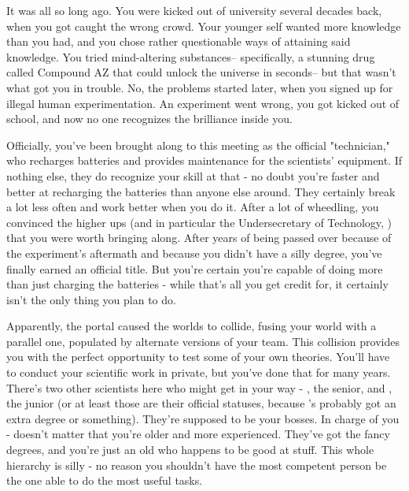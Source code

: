 \documentclass[char]{guildcamp3}
\begin{document}
\name{\cTech{}}

It was all so long ago. You were kicked out of university several decades back, when you got caught the wrong crowd. Your younger self wanted more knowledge than you had, and you chose rather questionable ways of attaining said knowledge. You tried mind-altering substances-- specifically, a stunning drug called Compound AZ that could unlock the universe in seconds-- but that wasn't what got you in trouble. No, the problems started later, when you signed up for illegal human experimentation. An experiment went wrong, you got kicked out of school, and now no one recognizes the brilliance inside you.

Officially, you've been brought along to this meeting as the official "technician," who recharges batteries and provides maintenance for the scientists' equipment. If nothing else, they do recognize your skill at that - no doubt you're faster and better at recharging the batteries than anyone else around. They certainly break a lot less often and work better when you do it. After a lot of wheedling, you convinced the higher ups (and in particular the Undersecretary of Technology, \cPoliTwo{\intro}) that you were worth bringing along. After years of being passed over because of the experiment's aftermath and because you didn't have a silly degree, you've finally earned an official title. But you're certain you're capable of doing more than just charging the batteries - while that's all you get credit for, it certainly isn't the only thing you plan to do. 

Apparently, the portal caused the worlds to collide, fusing your world with a parallel one, populated by alternate versions of your team. This collision provides you with the perfect opportunity to test some of your own theories. You'll have to conduct your scientific work in private, but you've done that for many years. There's two other scientists here who might get in your way - \cSciOne{\intro}, the senior, and \cSciTwo{\intro}, the junior (or at least those are their official statuses, because \cSciOne{}'s probably got an extra degree or something). They're supposed to be your bosses. In charge of you - doesn't matter that you're older and more experienced. They've got the fancy degrees, and you're just an old \cTech{\human} who happens to be good at stuff. This whole hierarchy is silly - no reason you shouldn't have the most competent person be the one able to do the most useful tasks. 
\end{document}
